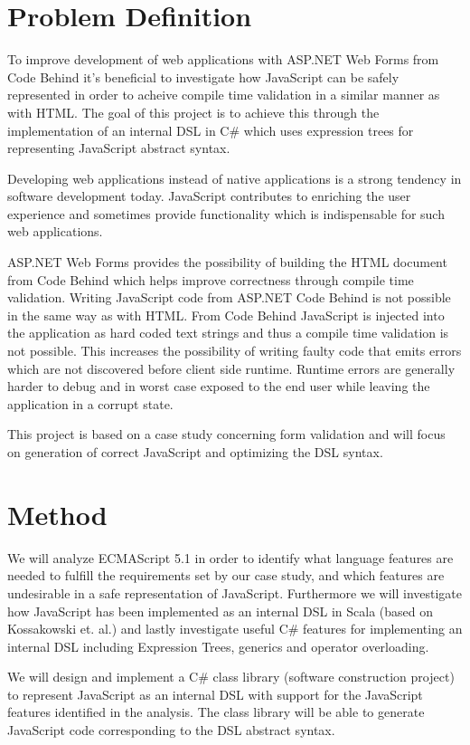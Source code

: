\section{Problem Definition}
	To improve development of web applications with ASP.NET Web Forms from Code Behind it’s beneficial to investigate how JavaScript can be safely represented in order to acheive compile time validation in a similar manner as with HTML. The goal of this project is to achieve this through the implementation of an internal DSL in C\# which uses expression trees for representing JavaScript abstract syntax.

	Developing web applications instead of native applications is a strong tendency in software development today. JavaScript contributes to enriching the user experience and sometimes provide functionality which is indispensable for such web applications.

	ASP.NET Web Forms provides the possibility of building the HTML document from Code Behind which helps improve correctness through compile time validation. Writing JavaScript code from ASP.NET Code Behind is not possible in the same way as with HTML. From Code Behind JavaScript is injected into the application as hard coded text strings and thus a compile time validation is not possible. This increases the possibility of writing faulty code that emits errors which are not discovered before client side runtime. Runtime errors are generally harder to debug and in worst case exposed to the end user while leaving the application in a corrupt state.

	This project is based on a case study concerning form validation and will focus on generation of correct JavaScript and optimizing the DSL syntax.

\section{Method}
	We will analyze ECMAScript 5.1 in order to identify what language features are needed to fulfill the requirements set by our case study, and which features are undesirable in a safe representation of JavaScript. Furthermore we will investigate how JavaScript has been implemented as an internal DSL in Scala (based on Kossakowski et. al.) and lastly investigate useful C\# features for implementing an internal DSL including Expression Trees, generics and operator overloading.

	We will design and implement a C\# class library (software construction project) to represent JavaScript as an internal DSL with support for the JavaScript features identified in the analysis. The class library will be able to generate JavaScript code corresponding to the DSL abstract syntax.

